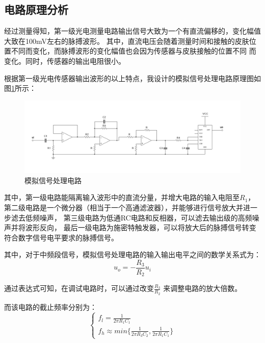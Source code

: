 \documentclass{article}
\begin{document}
\begin{spacing}{1.5}
\section{电路原理分析}

    经过测量得知，第一级光电测量电路输出信号大致为一个有直流偏移的，变化幅值大致在100mV左右的脉搏波形。
    其中，直流电压会随着测量时间和接触的皮肤位置不同而变化，而脉搏波形的变化幅值也会因为传感器与皮肤接触的位置不同
    而变化。同时，传感器的输出电阻很小。    

    根据第一级光电传感器输出波形的以上特点，我设计的模拟信号处理电路原理图如图\ref{fig:design1}所示：

    \begin{figure}[H]
        \centering
        \includegraphics[scale=0.4]{fig/design/design1.png}
        \caption{模拟信号处理电路}
        \label{fig:design1}
    \end{figure}

    其中，第一级电路能隔离输入波形中的直流分量，并增大电路的输入电阻至$R_1$，
    第二级电路是一个微分器（相当于一个高通滤波器），并能够进行信号放大并进一步滤去低频噪声，
    第三级电路为低通RC电路和反相器，可以滤去输出级的高频噪声并将波形反向，
    最后一级电路为施密特触发器，可以将放大后的脉搏信号转变符合数字信号电平要求的脉搏信号。

    其中，对于中频段信号，模拟信号处理电路的输入输出电平之间的数学关系式为：
    \begin{equation}
        u_o = - \frac{R_3}{R_2} u_i
    \end{equation}

    通过表达式可知，在调试电路时，可以通过改变$\frac{R_3}{R_2}$ 来调整电路的放大倍数。

    而该电路的截止频率分别为：
    \begin{equation}
        \begin{cases}
            f_l = \frac{1}{2 \pi R_1 C_1}\\
            f_h \approx min \{ \frac{1}{2 \pi R_3 C_2}, \frac{1}{2 \pi R_1 C_1} \}
        \end{cases}
    \end{equation}


\end{spacing}
\end{document}
